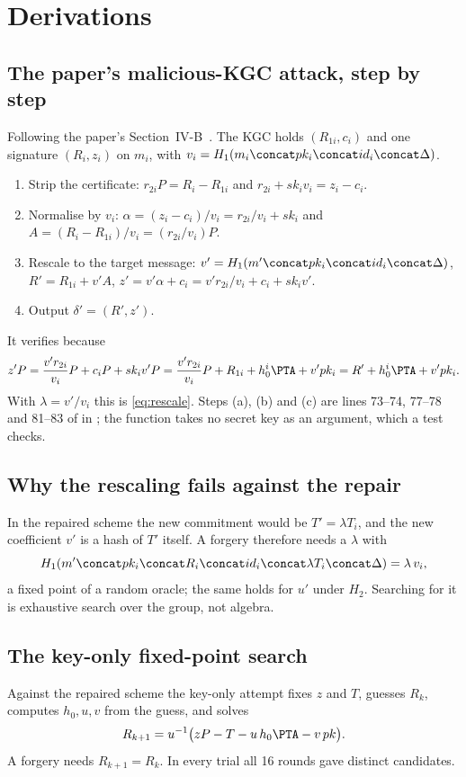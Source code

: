 \section{Derivations}\label{app:derivations}

\subsection{The paper's malicious-KGC attack, step by step}\label{app:attack}
Following the paper's Section~IV-B~\cite{qiao2023}. The KGC holds $(R_{1i},c_i)$ and one signature
$(R_i,z_i)$ on $m_i$, with $v_i=H_1(m_i\concat pk_i\concat id_i\concat\Delta)$.
\begin{enumerate}[label=(\alph*),itemsep=0pt]
\item Strip the certificate: $r_{2i}P=R_i-R_{1i}$ and $r_{2i}+sk_iv_i=z_i-c_i$.
\item Normalise by $v_i$:
      $\alpha=(z_i-c_i)/v_i=r_{2i}/v_i+sk_i$ and $A=(R_i-R_{1i})/v_i=(r_{2i}/v_i)P$.
\item Rescale to the target message: $v'=H_1(m'\concat pk_i\concat id_i\concat\Delta)$,
      $R'=R_{1i}+v'A$, $z'=v'\alpha+c_i=v'r_{2i}/v_i+c_i+sk_iv'$.
\item Output $\delta'=(R',z')$.
\end{enumerate}
It verifies because
\[
z'P=\frac{v'r_{2i}}{v_i}P+c_iP+sk_iv'P
=\frac{v'r_{2i}}{v_i}P+R_{1i}+h_0^i\PTA+v'pk_i
=R'+h_0^i\PTA+v'pk_i .
\]
With $\lambda=v'/v_i$ this is \cref{eq:rescale}. Steps (a), (b) and (c) are lines 73--74, 77--78 and 81--83
of  in ; the function takes no secret key as an argument, which a test
checks.

\subsection{Why the rescaling fails against the repair}
In the repaired scheme the new commitment would be $T'=\lambda T_i$, and the new coefficient $v'$ is a
hash of $T'$ itself. A forgery therefore needs a $\lambda$ with
\[
H_1(m'\concat pk_i\concat R_i\concat id_i\concat\lambda T_i\concat\Delta)=\lambda\,v_i ,
\]
a fixed point of a random oracle; the same holds for $u'$ under $H_2$. Searching for it is exhaustive search
over the group, not algebra.

\subsection{The key-only fixed-point search}
Against the repaired scheme the key-only attempt fixes $z$ and $T$, guesses $R_k$, computes
$h_0,u,v$ from the guess, and solves
\[
R_{k+1}=u^{-1}\big(zP-T-u\,h_0\PTA-v\,pk\big).
\]
A forgery needs $R_{k+1}=R_k$. In every trial all 16 rounds gave distinct candidates.

